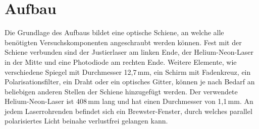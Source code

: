 
\section{Aufbau}

    Die Grundlage des Aufbaus bildet eine optische Schiene, an welche alle benötigten Versuchskomponenten
    angeschraubt werden können.
    Fest mit der Schiene verbunden sind der Justierlaser am linken Ende, der Helium-Neon-Laser in der Mitte
    und eine Photodiode am rechten Ende.
    Weitere Elemente, wie verschiedene Spiegel mit Durchmesser 12,7\,mm, ein Schirm mit Fadenkreuz,
    ein Polarisationsfilter, ein Draht oder ein optisches Gitter,
    können je nach Bedarf an beliebigen anderen Stellen der Schiene hinzugefügt werden.
    Der verwendete Helium-Neon-Laser ist 408\,mm lang und hat einen Durchmesser von 1,1\,mm.
    An jedem Laserrohrenden befindet sich ein Brewster-Fenster, durch welches parallel polarisiertes Licht
    beinahe verlustfrei gelangen kann.
